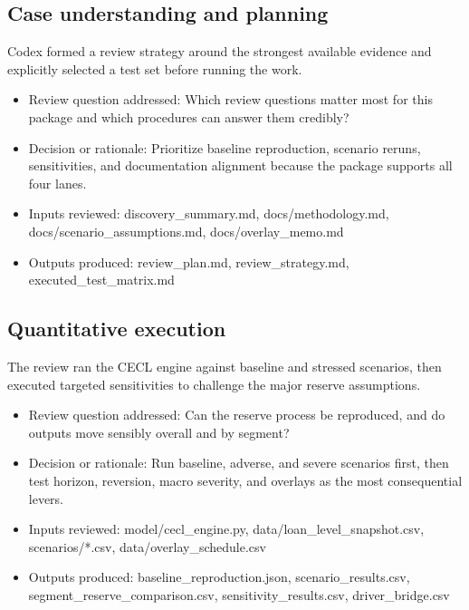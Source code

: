 \documentclass[11pt]{article}
\begin{document}
\subsection*{Case understanding and planning}
Codex formed a review strategy around the strongest available evidence and explicitly selected a test set before running the work.
\begin{itemize}
\item Review question addressed: Which review questions matter most for this package and which procedures can answer them credibly?
\item Decision or rationale: Prioritize baseline reproduction, scenario reruns, sensitivities, and documentation alignment because the package supports all four lanes.
\item Inputs reviewed: discovery\_summary.md, docs/methodology.md, docs/scenario\_assumptions.md, docs/overlay\_memo.md
\item Outputs produced: review\_plan.md, review\_strategy.md, executed\_test\_matrix.md
\end{itemize}
\subsection*{Quantitative execution}
The review ran the CECL engine against baseline and stressed scenarios, then executed targeted sensitivities to challenge the major reserve assumptions.
\begin{itemize}
\item Review question addressed: Can the reserve process be reproduced, and do outputs move sensibly overall and by segment?
\item Decision or rationale: Run baseline, adverse, and severe scenarios first, then test horizon, reversion, macro severity, and overlays as the most consequential levers.
\item Inputs reviewed: model/cecl\_engine.py, data/loan\_level\_snapshot.csv, scenarios/*.csv, data/overlay\_schedule.csv
\item Outputs produced: baseline\_reproduction.json, scenario\_results.csv, segment\_reserve\_comparison.csv, sensitivity\_results.csv, driver\_bridge.csv
\end{itemize}
\end{document}
